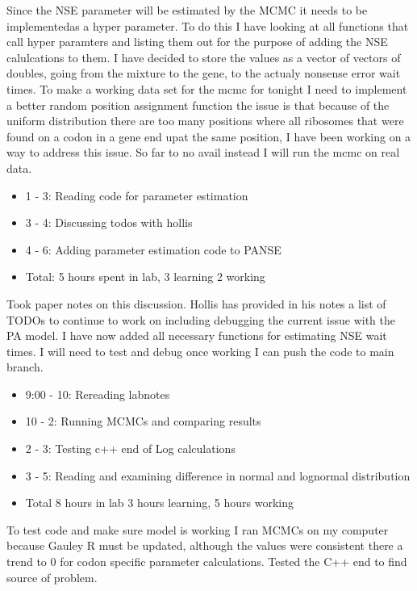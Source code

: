 \documentclass[12pt,hyperref]{labbook}
\begin{document}
Since the NSE parameter will be estimated by the MCMC it needs to be implementedas a hyper parameter. To do this I have looking at all functions that call hyper paramters and listing them out for the purpose of adding the NSE calulcations to them. I have decided to store the values as a vector of vectors of doubles, going from the mixture to the gene, to the actualy nonsense error wait times.
To make a working data set for the mcmc for tonight I need to implement a better random position assignment function the issue is that because of the uniform distribution there are too many positions where all ribosomes that were found on a codon in a gene end upat the same position, I have been working on a way to address this issue. So far to no avail instead I will run the mcmc on real data.
\begin{itemize}
    \item 1 - 3: Reading code for parameter estimation
    \item 3 - 4: Discussing todos with hollis
    \item 4 - 6: Adding parameter estimation code to PANSE
    \item Total: 5 hours spent in lab, 3 learning 2 working
\end{itemize}
Took paper notes on this discussion. Hollis has provided in his notes a list of TODOs to continue to work on including debugging the current issue with the PA model.
I have now added all necessary functions for estimating NSE wait times. I will need to test and debug once working I can push the code to main branch.
\begin{itemize}
    \item 9:00 - 10: Rereading labnotes
    \item 10 - 2: Running MCMCs and comparing results
    \item 2 - 3: Testing c++ end of Log calculations
    \item 3 - 5: Reading and examining difference in normal and lognormal distribution
    \item Total 8 hours in lab 3 hours learning, 5 hours working
\end{itemize}
To test code and make sure model is working I ran MCMCs on my computer because Gauley R must be updated, although the values were consistent there a trend to 0 for codon specific parameter calculations. Tested the C++ end to find source of problem. 
\end{document}
